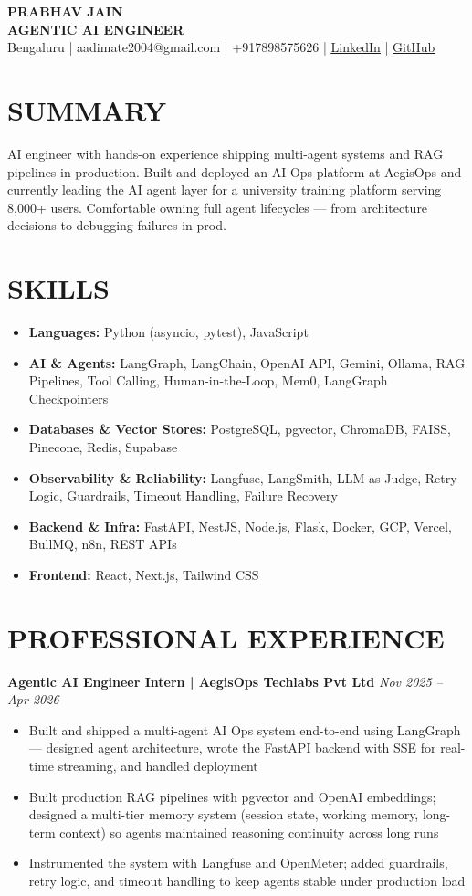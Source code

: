 \documentclass[9.5pt,a4paper]{article}
\begin{document}
{\LARGE \textbf{PRABHAV JAIN}}\\[2pt]
{\large \textbf{AGENTIC AI ENGINEER}}\\[2pt]
Bengaluru | aadimate2004@gmail.com | +917898575626 |
\href{https://www.linkedin.com/in/prabhavjain2004}{\underline{LinkedIn}} |
\href{https://github.com/prabhavjain2004}{\underline{GitHub}}

\section*{SUMMARY}
AI engineer with hands-on experience shipping multi-agent systems and RAG pipelines in production. Built and deployed an AI Ops platform at AegisOps and currently leading the AI agent layer for a university training platform serving 8,000+ users. Comfortable owning full agent lifecycles --- from architecture decisions to debugging failures in prod.

\section*{SKILLS}
\begin{itemize}
\item \textbf{Languages:} Python (asyncio, pytest), JavaScript
\item \textbf{AI \& Agents:} LangGraph, LangChain, OpenAI API, Gemini, Ollama, RAG Pipelines, Tool Calling, Human-in-the-Loop, Mem0, LangGraph Checkpointers
\item \textbf{Databases \& Vector Stores:} PostgreSQL, pgvector, ChromaDB, FAISS, Pinecone, Redis, Supabase
\item \textbf{Observability \& Reliability:} Langfuse, LangSmith, LLM-as-Judge, Retry Logic, Guardrails, Timeout Handling, Failure Recovery
\item \textbf{Backend \& Infra:} FastAPI, NestJS, Node.js, Flask, Docker, GCP, Vercel, BullMQ, n8n, REST APIs
\item \textbf{Frontend:} React, Next.js, Tailwind CSS
\end{itemize}

\section*{PROFESSIONAL EXPERIENCE}

\textbf{Agentic AI Engineer Intern | AegisOps Techlabs Pvt Ltd} \hfill \textit{Nov 2025 -- Apr 2026}
\begin{itemize}
\item Built and shipped a multi-agent AI Ops system end-to-end using LangGraph --- designed agent architecture, wrote the FastAPI backend with SSE for real-time streaming, and handled deployment
\item Built production RAG pipelines with pgvector and OpenAI embeddings; designed a multi-tier memory system (session state, working memory, long-term context) so agents maintained reasoning continuity across long runs
\item Instrumented the system with Langfuse and OpenMeter; added guardrails, retry logic, and timeout handling to keep agents stable under production load
\end{itemize}
\end{document}
